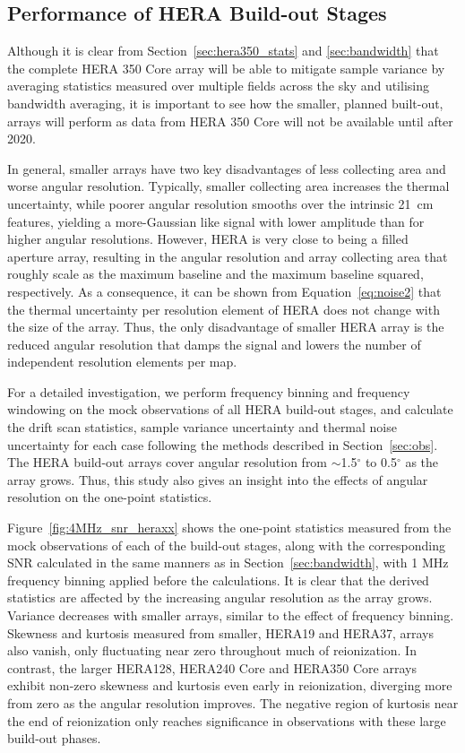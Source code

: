 \documentclass[fleqn,usenatbib]{mnras}
\begin{document}
\subsection{Performance of HERA Build-out Stages}
\label{sec:performance}

Although it is clear from Section~\ref{sec:hera350_stats} and \ref{sec:bandwidth} that the complete HERA 350 Core array will be able to mitigate sample variance by averaging statistics measured over multiple fields across the sky and utilising bandwidth averaging, it is important to see how the smaller, planned built-out, arrays will perform as data from HERA 350 Core will not be available until after 2020. 

In general, smaller arrays have two key disadvantages of less collecting area and worse angular resolution. Typically, smaller collecting area increases the thermal uncertainty, while poorer angular resolution smooths over the intrinsic 21~cm features, yielding a more-Gaussian like signal with lower amplitude than for higher angular resolutions. However, HERA is very close to being a filled aperture array, resulting in the angular resolution and array collecting area that roughly scale as the maximum baseline and the maximum baseline squared, respectively. As a consequence, it can be shown from Equation~\ref{eq:noise2} that the thermal uncertainty per resolution element of HERA does not change with the size of the array. Thus, the only disadvantage of smaller HERA array is the reduced angular resolution that damps the signal and lowers the number of independent resolution elements per map.

For a detailed investigation, we perform frequency binning and frequency windowing on the mock observations of all HERA build-out stages, and calculate the drift scan statistics, sample variance uncertainty and thermal noise uncertainty for each case following the methods  described in Section~\ref{sec:obs}. The HERA build-out arrays cover angular resolution from $\sim$1.5$^{\circ}$ to 0.5$^{\circ}$ as the array grows. Thus, this study also gives an insight into the effects of angular resolution on the one-point statistics.

Figure~\ref{fig:4MHz_snr_heraxx} shows the one-point statistics measured from the mock observations of each of the build-out stages, along with the corresponding SNR calculated in the same manners as in Section~\ref{sec:bandwidth}, with 1 MHz frequency binning applied before the calculations. It is clear that the derived statistics are affected by the increasing angular resolution as the array grows.  Variance decreases with smaller arrays, similar to the effect of frequency binning. Skewness and kurtosis measured from smaller, HERA19 and HERA37, arrays also vanish, only fluctuating near zero throughout much of reionization.  In contrast, the larger HERA128, HERA240 Core and HERA350 Core arrays exhibit non-zero skewness and kurtosis even early in reionization, diverging more from zero as the angular resolution improves. The negative region of kurtosis near the end of reionization only reaches significance in observations with these large build-out phases.
\end{document}
